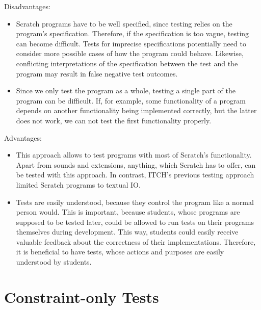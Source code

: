 
\noindent Disadvantages:

\begin{itemize}
    \item Scratch programs have to be well specified, since testing relies on the program's specification.
        Therefore, if the specification is too vague, testing can become difficult.
        Tests for imprecise specifications potentially need to consider more possible cases of how the program could behave.
        Likewise, conflicting interpretations of the specification between the test and the program may result in false negative test outcomes.
    \item Since we only test the program as a whole, testing a single part of the program can be difficult.
        If, for example, some functionality of a program depends on another functionality being implemented correctly,
        but the latter does not work, we can not test the first functionality properly.
\end{itemize}

\noindent Advantages:

\begin{itemize}
    \item This approach allows to test programs with most of Scratch's functionality.
        Apart from sounds and extensions, anything, which Scratch has to offer, can be tested with this approach.
        In contrast, ITCH's previous testing approach limited Scratch programs to textual IO.
    \item Tests are easily understood, because they control the program like a normal person would.
        This is important, because students, whose programs are supposed to be tested later,
        could be allowed to run tests on their programs themselves during development.
        This way, students could easily receive valuable feedback about the correctness of their implementations.
        Therefore, it is beneficial to have tests, whose actions and purposes are easily understood by students.
\end{itemize}

\section{Constraint-only Tests}%
\label{sec:constraint_only_tests}


